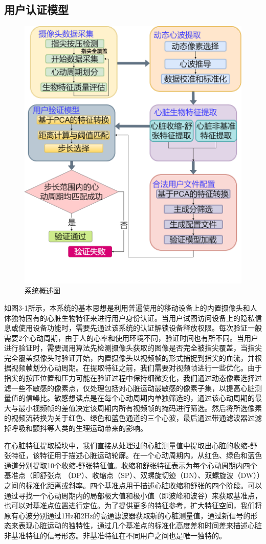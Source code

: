 \subsection{用户认证模型}
\begin{figure}[htbp]
  \centering
  \includegraphics[width=0.53\linewidth]{images/system.drawio.png}
  \caption{系统概述图}\label{3-1} %
\end{figure}
{如图3-1所示，本系统的基本思想是利用普遍使用的移动设备上的内置摄像头和人体独特固有的心脏生物特征来进行用户身份认证。当用户试图访问设备上的隐私信息或使用设备功能时，需要先通过该系统的认证解锁设备释放权限。每次验证一般需要2个心动周期，由于人的心率和使用环境不同，验证时间也有所不同。当用户进行验证时，需要调用算法先检测摄像头获取的图像是否完全被指尖覆盖，当指尖完全覆盖摄像头时验证开始，内置摄像头以视频帧的形式捕捉到指尖的血流，并根据视频帧划分心动周期。在提取特征之前，我们需要对视频帧进行一些优化。由于指尖的按压位置和压力可能在验证过程中保持细微变化，我们通过动态像素选择过滤一些不敏感的像素点，仅处理包括对心脏运动最敏感的像素子集，以提高心脏测量值的信噪比。敏感想读点是在每个心动周期内单独筛选的，通过该心动周期的最大与最小视频帧的差值决定该周期内所有视频帧的掩码进行筛选。然后将所选像素的视频流转换为关于红色、绿色和蓝色通道的三个心波，最后通过带通滤波器过滤掉呼吸和颤抖等人类的生理运动带来的影响。}
\par
{在心脏特征提取模块中，我们直接从处理过的心脏测量值中提取出心脏的收缩-舒张特征，该特征用于描述心脏运动轮廓。在一个心动周期内，从红色、绿色和蓝色通道分别提取10个收缩-舒张特征值。收缩和舒张特征表示为每个心动周期内四个基准点（即舒张点 （DP）、收缩点（SP）、双螺旋切迹（DN）、双螺旋波（DW）\cite{2007Photoplethysmography}）之间的标准化距离或斜率。四个基准点用于描述心脏收缩和舒张的四个阶段。可以通过寻找一个心动周期内的局部极大值和极小值（即波峰和波谷）来获取基准点，也可以对基准点位置进行定位。为了提供更多的特征参考，扩大特征空间，我们将原有心波分别通过1Hz和2Hz的高通滤波器获取新的心脏测量值，通过新信号的形态来表现心脏运动的独特性，通过几个基准点的标准化高度差和时间差来描述心脏非基准特征的信号形态。非基准特征在不同用户之间也是唯一独特的。}
